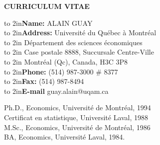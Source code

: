 



\setlength{\headheight}{0in}
\setlength{\headsep}{0in}
\setlength{\oddsidemargin}{0.35in}
\setlength{\topmargin}{0.25in}
\setlength{\textheight}{8.5in}
\setlength{\textwidth}{5.75in}






\centerline{\bf CURRICULUM VITAE}

\vspace{1 cm}

\noindent\hbox to 2in{\bf Name:\hfill} ALAIN GUAY\\

\noindent\hbox to 2in{\bf Address:\hfill} Universit\'e du Qu\'ebec \`a Montr\'eal\\
\noindent\hbox to 2in{\hfill} D\'epartement des sciences \'economiques\\
\noindent\hbox to 2in{\hfill} Case postale 8888, Succursale Centre-Ville\\
\noindent\hbox to 2in{\hfill} Montr\'eal (Qc), Canada, H3C 3P8\\

\noindent\hbox to 2in{\bf Phone:\hfill} (514) 987-3000 \# 8377\\
\noindent\hbox to 2in{\bf Fax:\hfill}  (514) 987-8494\\
\noindent\hbox to 2in{\bf E-mail\hfill}  guay.alain@uqam.ca\\

\vspace{1 cm}

 \vspace{.3 cm}

\noindent Ph.D., Economics, Universit\'e de Montr\'eal, 1994\\
\noindent Certificat en statistique, Universit\'e Laval, 1988\\
\noindent M.Sc., Economics, Universit\'e de Montr\'eal, 1986\\
\noindent BA, Economics, Universit\'e Laval, 1984.

\vspace{.5 cm}


 \vspace{.3 cm}


